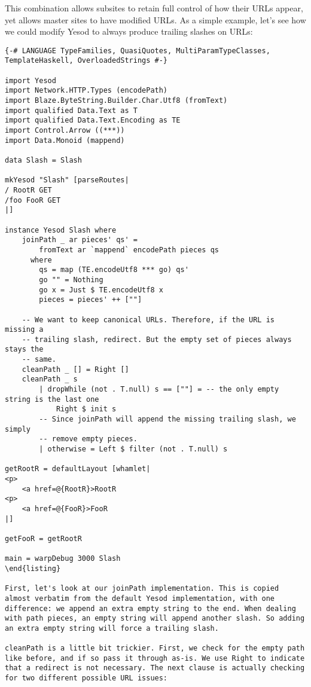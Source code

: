 This combination allows subsites to retain full control of how their URLs appear, yet allows master sites to have modified URLs. As a simple example, let's see how we could modify Yesod to always produce trailing slashes on URLs:

\begin{lstlisting}
{-# LANGUAGE TypeFamilies, QuasiQuotes, MultiParamTypeClasses, TemplateHaskell, OverloadedStrings #-}

import Yesod
import Network.HTTP.Types (encodePath)
import Blaze.ByteString.Builder.Char.Utf8 (fromText)
import qualified Data.Text as T
import qualified Data.Text.Encoding as TE
import Control.Arrow ((***))
import Data.Monoid (mappend)

data Slash = Slash

mkYesod "Slash" [parseRoutes|
/ RootR GET
/foo FooR GET
|]

instance Yesod Slash where
    joinPath _ ar pieces' qs' =
        fromText ar `mappend` encodePath pieces qs
      where
        qs = map (TE.encodeUtf8 *** go) qs'
        go "" = Nothing
        go x = Just $ TE.encodeUtf8 x
        pieces = pieces' ++ [""]

    -- We want to keep canonical URLs. Therefore, if the URL is missing a
    -- trailing slash, redirect. But the empty set of pieces always stays the
    -- same.
    cleanPath _ [] = Right []
    cleanPath _ s
        | dropWhile (not . T.null) s == [""] = -- the only empty string is the last one
            Right $ init s
        -- Since joinPath will append the missing trailing slash, we simply
        -- remove empty pieces.
        | otherwise = Left $ filter (not . T.null) s

getRootR = defaultLayout [whamlet|
<p>
    <a href=@{RootR}>RootR
<p>
    <a href=@{FooR}>FooR
|]

getFooR = getRootR

main = warpDebug 3000 Slash
\end{listing}

First, let's look at our joinPath implementation. This is copied almost verbatim from the default Yesod implementation, with one difference: we append an extra empty string to the end. When dealing with path pieces, an empty string will append another slash. So adding an extra empty string will force a trailing slash.

cleanPath is a little bit trickier. First, we check for the empty path like before, and if so pass it through as-is. We use Right to indicate that a redirect is not necessary. The next clause is actually checking for two different possible URL issues:


\end{lstlisting}
